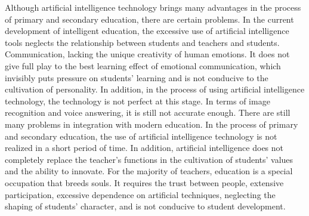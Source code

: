 \documentclass[lang=en,11pt,a4paper,towcolumn]{elegantpaper}
\begin{document}
{Although artificial intelligence technology brings many advantages in the process of primary and secondary education, there are certain problems. In the current development of intelligent education, the excessive use of artificial intelligence tools neglects the relationship between students and teachers and students. Communication, lacking the unique creativity of human emotions. It does not give full play to the best learning effect of emotional communication, which invisibly puts pressure on students' learning and is not conducive to the cultivation of personality. In addition, in the process of using artificial intelligence technology, the technology is not perfect at this stage. In terms of image recognition and voice answering, it is still not accurate enough. There are still many problems in integration with modern education. In the process of primary and secondary education, the use of artificial intelligence technology is not realized in a short period of time. In addition, artificial intelligence does not completely replace the teacher's functions in the cultivation of students' values and the ability to innovate. For the majority of teachers, education is a special occupation that breeds souls. It requires the trust between people, extensive participation, excessive dependence on artificial techniques, neglecting the shaping of students' character, and is not conducive to student development.
}
\end{document}
